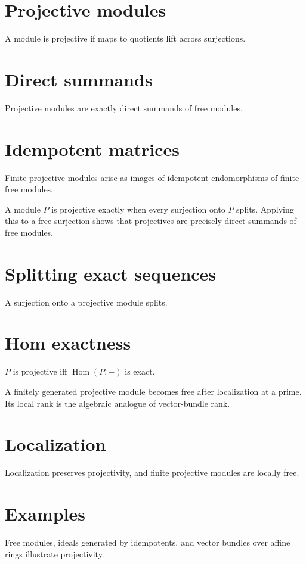\section{Projective modules}
A module is projective if maps to quotients lift across surjections.

\section{Direct summands}
Projective modules are exactly direct summands of free modules.

\section{Idempotent matrices}
Finite projective modules arise as images of idempotent endomorphisms of finite free modules.

\begin{example}\label{ex:v13-expand-02}
A module $P$ is projective exactly when every surjection onto $P$ splits. Applying this to a free surjection shows that projectives are precisely direct summands of free modules.
\end{example}
\section{Splitting exact sequences}
A surjection onto a projective module splits.

\section{Hom exactness}
$P$ is projective iff $\operatorname{Hom}(P,-)$ is exact.

\begin{example}\label{ex:v13-expand-03}
A finitely generated projective module becomes free after localization at a prime. Its local rank is the algebraic analogue of vector-bundle rank.
\end{example}
\section{Localization}
Localization preserves projectivity, and finite projective modules are locally free.

\section{Examples}
Free modules, ideals generated by idempotents, and vector bundles over affine rings illustrate projectivity.

